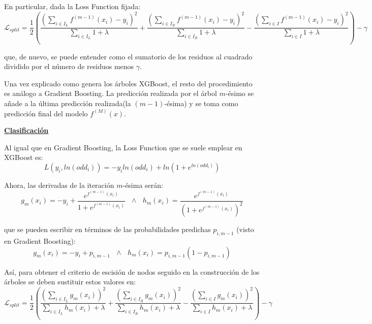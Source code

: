 \documentclass[12pt,twoside]{article}
\begin{document}
En particular, dada la Loss Function fijada:
\begin{equation*}
\mathcal{L}_{split} = \frac{1}{2} \left( \frac{\left( \sum_{i \in I_L} f^{(m-1)}(x_i) - y_i \right)^2}{\sum_{i \in I_L} 1 + \lambda} + \frac{\left( \sum_{i \in I_R} f^{(m-1)}(x_i) - y_i \right)^2}{\sum_{i \in I_R} 1 + \lambda} - \frac{\left( \sum_{i \in I} f^{(m-1)}(x_i) - y_i \right)^2}{\sum_{i \in I} 1 + \lambda} \right)   - \gamma
\end{equation*}

\noindent
que, de nuevo, se puede entender como el sumatorio de los residuos al cuadrado dividido por el número de residuos menos $\gamma$.

Una vez explicado como genera los árboles XGBoost, el resto del procedimiento es análogo a Gradient Boosting. La predicción realizada por el árbol $m$-ésimo se añade a la última predicción realizada(la $(m-1)$-ésima) y se toma como predicción final del modelo $f^{(M)}(x)$.



\bigskip

\textbf{\underline{Clasificación}}

Al igual que en Gradient Boosting, la Loss Function que se suele emplear en XGBoost es:
\begin{equation*}
L(y_i, ln(odd_i)) = -y_i ln(odd_i) + ln \left( 1 + e^{ln(odd_i)} \right)
\end{equation*}

Ahora, las derivadas de la iteración $m$-ésima serán:
\begin{equation*}
g_m(x_i) = -y_i + \frac{e^{f^{(m-1)}(x_i)}}{1 + e^{f^{(m-1)}(x_i)}} \, \, \, \, \wedge \, \, \, \, h_m(x_i) = \frac{e^{f^{(m-1)}(x_i)}}{(1 + e^{f^{(m-1)}(x_i)})^2}
\end{equation*}

\noindent
que se pueden escribir en términos de las probabilidades predichas $p_{i, m-1}$ (visto en Gradient Boosting):
\begin{equation*}
g_m(x_i) = -y_i + p_{i, m-1} \, \, \, \, \wedge \, \, \, \, h_m(x_i) = p_{i, m-1}(1 - p_{i, m-1})
\end{equation*}

Así, para obtener el criterio de escisión de nodos seguido en la construcción de los árboles se deben sustituir estos valores en:
\begin{equation*}
\mathcal{L}_{split} = \frac{1}{2} \left( \frac{\left( \sum_{i \in I_L} g_m(x_i) \right)^2}{\sum_{i \in I_L} h_m(x_i) + \lambda} + \frac{\left( \sum_{i \in I_R} g_m(x_i) \right)^2}{\sum_{i \in I_R} h_m(x_i) + \lambda} - \frac{\left( \sum_{i \in I} g_m(x_i) \right)^2}{\sum_{i \in I} h_m(x_i) + \lambda} \right)   - \gamma 
\end{equation*}
\end{document}
